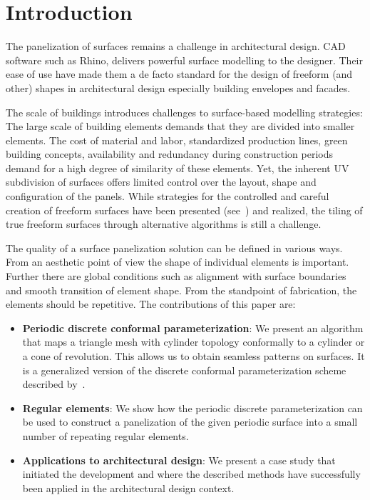 \documentclass[Thesis.tex]{subfiles}
\begin{document}
\section{Introduction}
\label{sec:introduction}

The panelization of surfaces remains a challenge in architectural
design. CAD software such as Rhino, delivers powerful \nurbs surface
modelling to the designer. Their ease of use have made them a de facto
standard for the design of freeform (and other) shapes in
architectural design especially building envelopes and facades.  

The scale of buildings introduces challenges to surface-based
modelling strategies: The large scale of building elements demands
that they are divided into smaller elements. The cost of material and
labor, standardized production lines, green building concepts,
availability and redundancy during construction periods demand for a
high degree of similarity of these elements. Yet, the inherent
UV subdivision of \nurbs surfaces offers limited control over the
layout, shape and configuration of the panels. While strategies for
the controlled and careful creation of freeform surfaces have been
presented (see~\cite{GlymphSCMS2004}) and realized, the tiling of true
freeform surfaces through alternative algorithms is still a challenge.

The quality of a surface panelization solution can be defined in
various ways. From an aesthetic point of view the shape of individual
elements is important. Further there are global conditions such as
alignment with surface boundaries and smooth transition of element
shape. From the standpoint of fabrication, the elements should be
repetitive. The contributions of this paper are:

\begin{itemize}
\item {\bf Periodic discrete conformal parameterization}:
  We present an algorithm that maps a triangle mesh with cylinder
  topology conformally to a cylinder or a cone of revolution. This
  allows us to obtain seamless patterns on surfaces. It is a
  generalized version of the discrete conformal parameterization
  scheme described by~\cite{Springborn2008}.
\item {\bf Regular elements}:
  We show how the periodic discrete parameterization can be used to
  construct a panelization of the given periodic surface into a small
  number of repeating regular elements.
\item {\bf Applications to architectural design}: 
  We present a case study that initiated the development and where the
  described methods have successfully been applied in the architectural design
  context.
\end{itemize}
\end{document}
